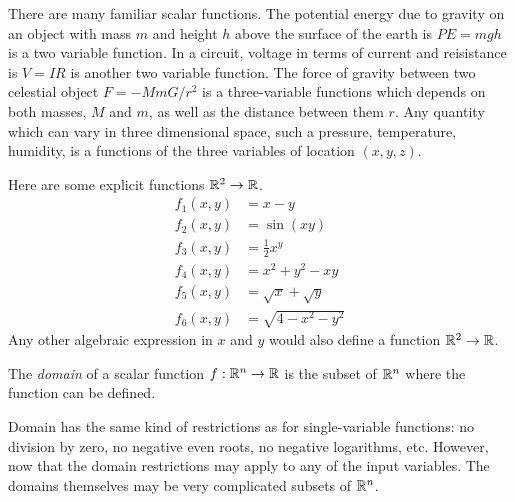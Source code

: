 \documentclass[fleqn,letterpaper]{report}
\begin{document}
\begin{example}
There are many familiar scalar functions. 
The potential energy due to gravity on an object with mass
$m$ and height $h$ above the surface of the earth is $PE = mgh$
is a two variable function.
In a circuit, voltage in terms of current and reisistance is $V
= IR$ is another two variable
function. The force of gravity between two celestial object
$F = -MmG/r^2$ is a three-variable functions which depends on
both masses, $M$ and $m$, as well as the distance between them
$r$. Any quantity which can vary in three dimensional space,
such a pressure, temperature, humidity, is a functions of the
three variables of location $(x,y,z)$.
\end{example} 

\begin{example}
\label{example-multivariable1}
Here are some explicit functions $\mathbb{R}^2 \rightarrow \mathbb{R}$. 
\begin{align*}
f_1(x,y) & = x-y \\
f_2(x,y) & = \sin (xy) \\
f_3(x,y) & = \frac{1}{2} x^y \\
f_4(x,y) & = x^2 + y^2 - xy \\
f_5(x,y) & = \sqrt{x} + \sqrt{y} \\
f_6(x,y) & = \sqrt{4 - x^2 -y^2}
\end{align*}
Any other algebraic expression in $x$ and $y$ would also
define a function $\mathbb{R}^2 \rightarrow \mathbb{R}$.
\end{example}

\begin{defn}
The \emph{domain} of a scalar function $f: \mathbb{R}^n \rightarrow
\mathbb{R}$ is the subset of $\mathbb{R}^n$ where the function can be
defined. 
\end{defn}

Domain has the same kind of restrictions as for
single-variable functions: no division by zero, no negative
even roots, no negative logarithms, etc. However, now 
that the domain restrictions may apply to any of the input
variables. The domains themselves may be very complicated
subsets of $\mathbb{R}^n$. 
\end{document}
